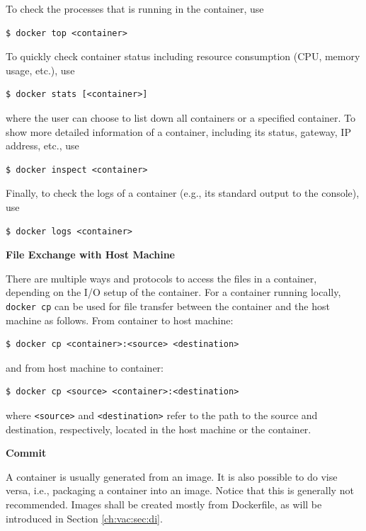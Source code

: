 To check the processes that is running in the container, use
\begin{lstlisting}
$ docker top <container>
\end{lstlisting}

To quickly check container status including resource consumption (CPU, memory usage, etc.), use
\begin{lstlisting}
$ docker stats [<container>]
\end{lstlisting}
where the user can choose to list down all containers or a specified container. To show more detailed information of a container, including its status, gateway, IP address, etc., use
\begin{lstlisting}
$ docker inspect <container>
\end{lstlisting}
Finally, to check the logs of a container (e.g., its standard output to the console), use
\begin{lstlisting}
$ docker logs <container>
\end{lstlisting}

\vspace{0.1in}
\noindent \textbf{File Exchange with Host Machine}
\vspace{0.1in}

There are multiple ways and protocols to access the files in a container, depending on the I/O setup of the container. For a container running locally, \verb|docker cp| can be used for file transfer between the container and the host machine as follows. From container to host machine:
\begin{lstlisting}
$ docker cp <container>:<source> <destination>
\end{lstlisting}
and from host machine to container:
\begin{lstlisting}
$ docker cp <source> <container>:<destination>
\end{lstlisting}
where \verb|<source>| and \verb|<destination>| refer to the path to the source and destination, respectively, located in the host machine or the container.

\vspace{0.1in}
\noindent \textbf{Commit}
\vspace{0.1in}

A container is usually generated from an image. It is also possible to do vise versa, i.e., packaging a container into an image. Notice that this is generally not recommended. Images shall be created mostly from Dockerfile, as will be introduced in Section \ref{ch:vac:sec:di}.

